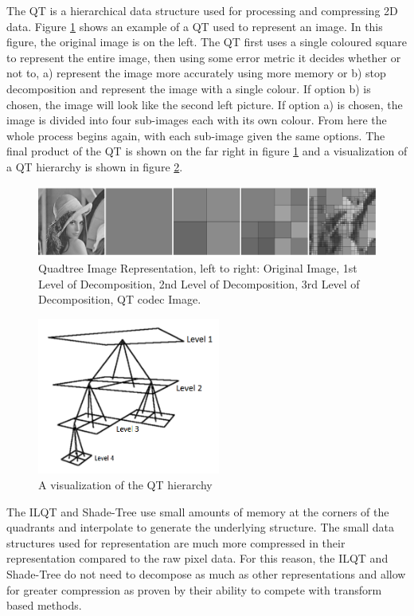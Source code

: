 The QT is a hierarchical data structure used for processing and compressing 2D data. Figure \ref{QuadtreeExample} shows an example of a QT used to represent an image. In this figure, the original image is on the left. The QT first uses a single coloured square to represent the entire image, then using some error metric it decides whether or not to, a) represent the image more accurately using more memory or b) stop decomposition and represent the image with a single colour. If option b) is chosen, the image will look like the second left picture. If option a) is chosen, the image is divided into four sub-images each with its own colour. From here the whole process begins again, with each sub-image given the same options. The final product of the QT is shown on the far right in figure \ref{QuadtreeExample} and a visualization of a QT hierarchy is shown in figure \ref{QuadTreeHierarchy}. \\


\begin{figure}[!htb]
\centering
\includegraphics[width=12cm]{images/ch2/quadtreeexample}
\caption{Quadtree Image Representation, left to right: Original Image, 1st Level of Decomposition, 2nd Level of Decomposition, 3rd Level of Decomposition, QT codec Image.}
\label{QuadtreeExample}
\end{figure}


\begin{figure}[!htb]
\centering
\includegraphics[width=6cm]{images/ch2/QuadTreeHierarchy}
\caption{A visualization of the QT hierarchy}
\label{QuadTreeHierarchy}
\end{figure}

The ILQT and Shade-Tree use small amounts of memory at the corners of the quadrants and interpolate to generate the underlying structure. The small data structures used for representation are much more compressed in their representation compared to the raw pixel data. For this reason, the ILQT and Shade-Tree do not need to decompose as much as other representations and allow for greater compression as proven by their ability to compete with transform based methods. \\

